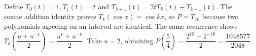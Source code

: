 Define $T_0(t)=1,T_1(t)=t$ and $T_{k+1}(t)=2tT_k(t)-T_{k-1}(t)$. The cosine addition identity proves $T_k(\cos x)=\cos kx$, so $P=T_{10}$ because two polynomials agreeing on an interval are identical. The same recurrence shows $T_k\left(\dfrac{u+u^{-1}}{2}\right)=\dfrac{u^k+u^{-k}}{2}$. Take $u=2$, obtaining $P (\dfrac{5}{4}) = \dfrac{2^{10}+2^{-10}}{2} = \boxed{\dfrac{1048577}{2048}}$.
